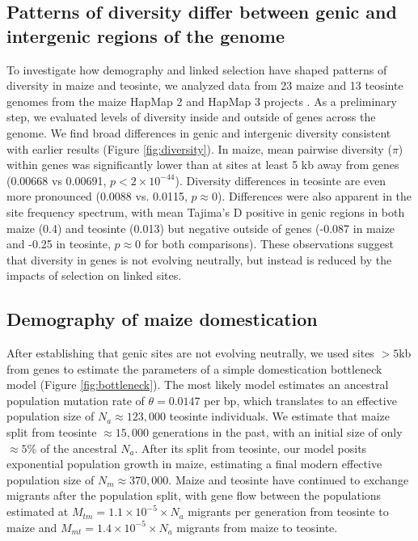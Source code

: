 \documentclass{pnastwo}
\begin{document}
\begin{article}
\subsection{Patterns of diversity differ between genic and  intergenic regions of the genome} %
To investigate how demography and linked selection have shaped patterns of diversity in maize and teosinte, we analyzed data from 23 maize and 13 teosinte genomes from the maize HapMap 2 and HapMap 3 projects \cite{chia2012, bukowski2015}. As a preliminary step, we evaluated levels of diversity inside and outside of genes across the genome. We find broad differences in genic and intergenic diversity consistent with earlier results  \cite{hufford2012}(Figure \ref{fig:diversity}).  In maize, mean pairwise diversity ($\pi$) within genes was significantly lower than at sites at least 5 kb away from genes (0.00668 vs 0.00691, $p<2\times 10^{-44}$). 
Diversity differences in teosinte are even more pronounced (0.0088 vs. 0.0115, $p\approx 0$). 
Differences were also apparent in the site frequency spectrum, with mean Tajima's D positive in genic regions in both maize (0.4) and teosinte (0.013) but negative outside of genes (-0.087 in maize and -0.25 in teosinte, $p\approx 0$ for both comparisons).
These observations suggest that diversity in genes is not evolving neutrally, but instead is reduced by the impacts of selection on linked sites. 



\subsection{Demography of maize domestication} %
After establishing that genic sites are not evolving neutrally, we used sites $>5$kb from genes to estimate the parameters of a simple domestication bottleneck model  (Figure \ref{fig:bottleneck}). 
The most likely model estimates an ancestral population mutation rate of $\theta=0.0147$ per bp, which translates to an effective population size of $N_a \approx 123,000$ teosinte individuals.
We estimate that maize split from teosinte $\approx 15,000$ generations in the past, with an initial size of only $\approx 5\% $ of the ancestral $N_a$. 
After its split from teosinte, our model posits exponential population growth in maize, estimating a final modern effective population size of $N_m \approx 370,000$.
Maize and teosinte have continued to exchange migrants after the population split, with gene flow between the populations estimated at $M_{tm} =  1.1 \times 10^{-5} \times N_a $  migrants per generation from teosinte to maize and $M_{mt} =  1.4 \times 10^{-5} \times N_a$ migrants from maize to teosinte. 


\end{article}
\end{document}
